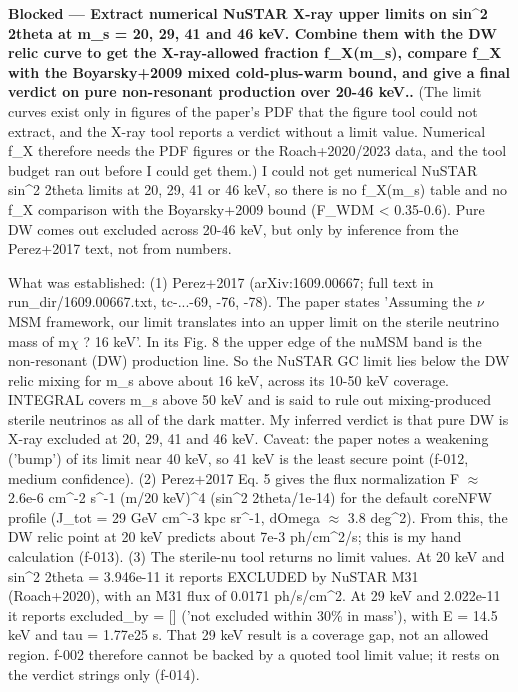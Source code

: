 \documentclass[11pt,a4paper]{article}
\begin{document}
\textbf{Blocked --- Extract numerical NuSTAR X-ray upper limits on sin\textasciicircum{}2 2theta at m\_s = 20, 29, 41 and 46 keV. Combine them with the DW relic curve to get the X-ray-allowed fraction f\_X(m\_s), compare f\_X with the Boyarsky+2009 mixed cold-plus-warm bound, and give a final verdict on pure non-resonant production over 20-46 keV..} (The limit curves exist only in figures of the paper's PDF that the figure tool could not extract, and the X-ray tool reports a verdict without a limit value. Numerical f\_X therefore needs the PDF figures or the Roach+2020/2023 data, and the tool budget ran out before I could get them.) I could not get numerical NuSTAR sin\textasciicircum{}2 2theta limits at 20, 29, 41 or 46 keV, so there is no f\_X(m\_s) table and no f\_X comparison with the Boyarsky+2009 bound (F\_WDM \textless{} 0.35-0.6). Pure DW comes out excluded across 20-46 keV, but only by inference from the Perez+2017 text, not from numbers.

What was established: (1) Perez+2017 (arXiv:1609.00667; full text in run\_dir/1609.00667.txt, tc-...-69, -76, -78). The paper states 'Assuming the $\nu$MSM framework, our limit translates into an upper limit on the sterile neutrino mass of m$\chi$ ? 16 keV'. In its Fig. 8 the upper edge of the nuMSM band is the non-resonant (DW) production line. So the NuSTAR GC limit lies below the DW relic mixing for m\_s above about 16 keV, across its 10-50 keV coverage. INTEGRAL covers m\_s above 50 keV and is said to rule out mixing-produced sterile neutrinos as all of the dark matter. My inferred verdict is that pure DW is X-ray excluded at 20, 29, 41 and 46 keV. Caveat: the paper notes a weakening ('bump') of its limit near 40 keV, so 41 keV is the least secure point (f-012, medium confidence). (2) Perez+2017 Eq. 5 gives the flux normalization F $\approx$ 2.6e-6 cm\textasciicircum{}-2 s\textasciicircum{}-1 (m/20 keV)\textasciicircum{}4 (sin\textasciicircum{}2 2theta/1e-14) for the default coreNFW profile (J\_tot = 29 GeV cm\textasciicircum{}-3 kpc sr\textasciicircum{}-1, dOmega $\approx$ 3.8 deg\textasciicircum{}2). From this, the DW relic point at 20 keV predicts about 7e-3 ph/cm\textasciicircum{}2/s; this is my hand calculation (f-013). (3) The sterile-nu tool returns no limit values. At 20 keV and sin\textasciicircum{}2 2theta = 3.946e-11 it reports EXCLUDED by NuSTAR M31 (Roach+2020), with an M31 flux of 0.0171 ph/s/cm\textasciicircum{}2. At 29 keV and 2.022e-11 it reports excluded\_by = [] ('not excluded within 30\% in mass'), with E = 14.5 keV and tau = 1.77e25 s. That 29 keV result is a coverage gap, not an allowed region. f-002 therefore cannot be backed by a quoted tool limit value; it rests on the verdict strings only (f-014).
\end{document}
